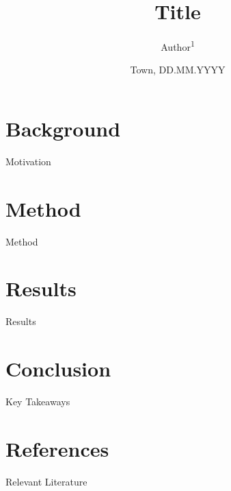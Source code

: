 \documentclass[10pt]{beamer}
\title{Title}
\author{Author\textsuperscript{1}}
\institute{\textsuperscript{1}Technische Universität Wien (TU Wien)
}
\date{Town, DD.MM.YYYY}
\begin{document}

\begin{frame}[plain]
	\maketitle %
\end{frame}


\section{Background}
\begin{frame}{Motivation}

\end{frame}


\section{Method}

\begin{frame}{Method}

\end{frame}


\section{Results}

\begin{frame}{Results}

\end{frame}

\section{Conclusion}
\begin{frame}{Key Takeaways}





\end{frame}

\appendix

\section*{References}

\begin{frame}[allowframebreaks]{Relevant Literature}
    \footnotesize
    \printbibliography[heading=none]
    
\end{frame}
\end{document}
